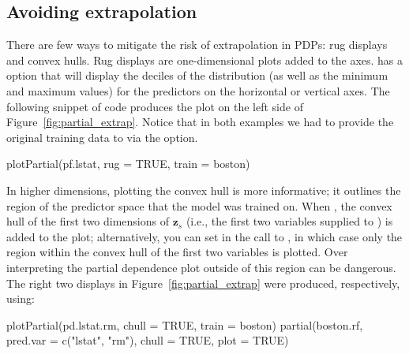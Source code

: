 

\subsection{Avoiding extrapolation}

There are few ways to mitigate the risk of extrapolation in PDPs: rug displays and convex hulls. Rug displays are one-dimensional plots added to the axes.  has a  option that will display the deciles of the distribution (as well as the minimum and maximum values) for the predictors on the horizontal or vertical axes. The following snippet of code produces the plot on the left side of Figure~\ref{fig:partial_extrap}. Notice that in both examples we had to provide the original training data to  via the  option.
\begin{example}
plotPartial(pf.lstat, rug = TRUE, train = boston)
\end{example}

In higher dimensions, plotting the convex hull is more informative; it outlines the region of the predictor space that the model was trained on. When , the convex hull of the first two dimensions of $\boldsymbol{z}_s$ (i.e., the first two variables supplied to ) is added to the plot; alternatively, you can set  in the call to , in which case only the region within the convex hull of the first two variables is plotted. Over interpreting the partial dependence plot outside of this region can be dangerous. The right two displays in Figure~\ref{fig:partial_extrap} were produced, respectively, using:
\begin{example}
plotPartial(pd.lstat.rm, chull = TRUE, train = boston)
partial(boston.rf, pred.var = c("lstat", "rm"), chull = TRUE, plot = TRUE)
\end{example}

